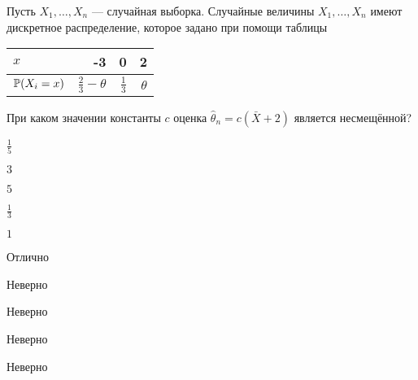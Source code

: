 
\begin{question}
Пусть \(X_1, \ldots , X_n\) — случайная выборка. Случайные величины
\(X_1, \ldots, X_n\) имеют дискретное распределение, которое задано при
помощи таблицы

\begin{center}
\begin{tabular}{lrrr} \toprule
$x$  & -3 & 0 & 2 \\
\midrule
$\P(X_i=x)$ & $\frac{2}{3} - \theta$ & $\frac{1}{3}$ & $\theta$\\
\bottomrule
\end{tabular}
\end{center}

При каком значении константы \(c\) оценка
\(\hat{\theta}_n = c (\bar{X} + 2)\) является несмещённой?
\begin{answerlist}
  \item \(\frac{1}{5}\)
  \item \(3\)
  \item \(5\)
  \item \(\frac{1}{3}\)
  \item \(1\)
\end{answerlist}
\end{question}

\begin{solution}
\begin{answerlist}
  \item Отлично
  \item Неверно
  \item Неверно
  \item Неверно
  \item Неверно
\end{answerlist}
\end{solution}

